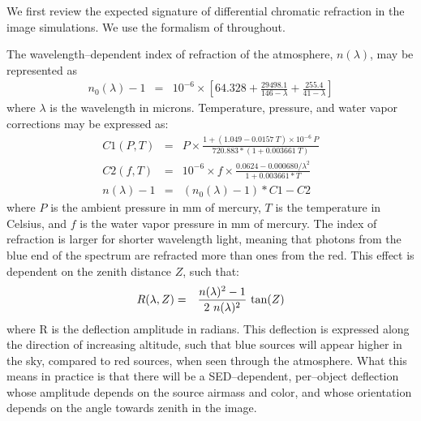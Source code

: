 \documentclass[prd, nofootinbib, floatfix, 11pt, tightenlines, times]{article}
\begin{document}
We first review the expected signature of differential chromatic
refraction in the image simulations.  We use the formalism of
\cite{1982PASP...94..715F} throughout.

The wavelength--dependent index of refraction of the atmosphere,
$n(\lambda)$, may be represented as
\begin{eqnarray}
\label{eqn:dcr0}
n_0(\lambda) - 1 & = & 10^{-6} \times \left[ 64.328 + \frac{29498.1}{146 - \lambda} + \frac{255.4}{41 - \lambda} \right]
\end{eqnarray}
where $\lambda$ is the wavelength in microns.  Temperature, pressure,
and water vapor corrections may be expressed as:
\begin{eqnarray}
\label{eqn:dcr}
C1(P,T) & = & P \times \frac{1 + (1.049 - 0.0157~T) \times 10^{-6}~P}{720.883 * (1 + 0.003661~T)} \\
C2(f,T) & = & 10^{-6} \times f \times \frac{0.0624 - 0.000680/\lambda^2}{1 + 0.003661 * T} \\
n(\lambda) - 1 & = & (n_0(\lambda) - 1) * C1 - C2 
\end{eqnarray}
where $P$ is the ambient pressure in mm of mercury, $T$ is the
temperature in Celsius, and $f$ is the water vapor pressure in mm of
mercury.  The index of refraction is larger for shorter wavelength
light, meaning that photons from the blue end of the spectrum are
refracted more than ones from the red.  This effect is dependent on
the zenith distance $Z$, such that:
\begin{eqnarray}
R(\lambda, Z) & = & \frac{n(\lambda)^2 - 1}{2~n(\lambda)^2}~{\rm tan}(Z)
\end{eqnarray}
where R is the deflection amplitude in radians.  This deflection is
expressed along the direction of increasing altitude, such that blue
sources will appear higher in the sky, compared to red sources, when
seen through the atmosphere.  What this means in practice is that
there will be a SED--dependent, per--object deflection whose amplitude
depends on the source airmass and color, and whose orientation depends
on the angle towards zenith in the image.
\end{document}
